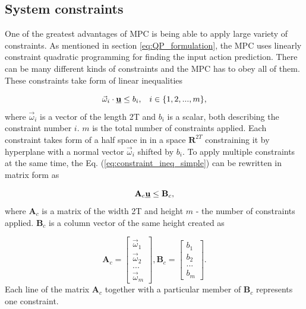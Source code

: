 \documentclass[a4paper,11pt,titlepage]{article}
\newcommand{\uvec}{\textbf{\underline{u}}}
\newcommand{\macoi}{\vec{\omega}_i}
\begin{document}
\subsection{System constraints} \label{sec:system_constraints}
One of the greatest advantages of MPC is being able to apply large variety of constraints. As mentioned in section \ref{eq:QP_formulation}, the MPC uses linearly constraint quadratic programming for finding the input action prediction. There can be many different kinds of constraints and the MPC has to obey all of them. These constraints take form of linear inequalities

\begin{equation}
\label{eq:constraint_ineq_simple}
\macoi \cdot \uvec \leq b_i, \;\;\; i \in \{1, 2, ..., m\},
\end{equation}
where $\vec{\omega}_i$ is a vector of the length 2T and $b_i$ is a scalar, both describing the constraint number $i$. $m$ is the total number of constraints applied. Each constraint takes form of a half space in in a space $\textbf{R}^{2T}$ constraining it by hyperplane with a normal vector $\vec{\omega}_i$ shifted by $b_i$. To apply multiple constraints at the same time, the Eq. (\ref{eq:constraint_ineq_simple}) can be rewritten in matrix form as 

\begin{equation}
\label{eq:MPC_cond}
\textbf{A}_c \uvec \leq \textbf{B}_c,
\end{equation}
where $\textbf{A}_c$ is a matrix of the width 2T and height $m$ - the number of constraints applied. $\textbf{B}_c$ is a column vector of the same height created as

\begin{equation}
\textbf{A}_c =
  \begin{bmatrix}
  \vec{\omega}_1 \\
  \vec{\omega}_2 \\
  ...	   \\
  \vec{\omega}_m
  \end{bmatrix},\textbf{B}_c = \begin{bmatrix}
  b_1 \\
  b_2 \\
  ... \\
  b_m
  \end{bmatrix}.
\end{equation}
Each line of the matrix $\textbf{A}_c$ together with a particular member of $\textbf{B}_c$ represents one constraint. 
\end{document}
